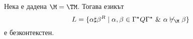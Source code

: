 

\begin{lemma}
  Нека е дадена $\M = \TM$.
  Тогава езикът 
  \[L = \{\alpha\sharp\beta^R \mid \alpha,\beta \in \Gamma^\star Q \Gamma^\star\ \&\  \alpha \not\vdash_\M \beta\}\]
  е безконтекстен.
\end{lemma}







